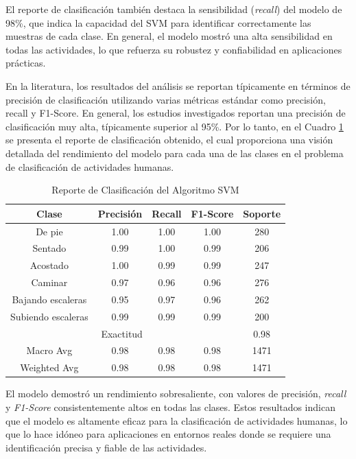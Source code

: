 \documentclass{esannV2}
\begin{document}
El reporte de clasificación también destaca la sensibilidad (\textit{recall}) del modelo de 98\%, que indica la capacidad del SVM para identificar correctamente las muestras de cada clase. En general, el modelo mostró una alta sensibilidad en todas las actividades, lo que refuerza su robustez y confiabilidad en aplicaciones prácticas.

En la literatura, los resultados del análisis se reportan típicamente en términos de precisión de clasificación utilizando varias métricas estándar como precisión, recall y F1-Score. En general, los estudios investigados reportan una precisión de clasificación muy alta, típicamente superior al 95\%. Por lo tanto, en el Cuadro \ref{tab:classification_report} se presenta el reporte de clasificación obtenido, el cual proporciona una visión detallada del rendimiento del modelo para cada una de las clases en el problema de clasificación de actividades humanas.

\begin{table}[h]
    \centering
    \begin{tabular}{|c|c|c|c|c|}
        \hline
        \textbf{Clase} & \textbf{Precisión} & \textbf{Recall} & \textbf{F1-Score} & \textbf{Soporte} \\ \hline
        De pie & 1.00 & 1.00 & 1.00 & 280 \\ \hline
        Sentado & 0.99 & 1.00 & 0.99 & 206 \\ \hline
        Acostado & 1.00 & 0.99 & 0.99 & 247 \\ \hline
        Caminar & 0.97 & 0.96 & 0.96 & 276 \\ \hline
        Bajando escaleras & 0.95 & 0.97 & 0.96 & 262 \\ \hline
        Subiendo escaleras & 0.99 & 0.99 & 0.99 & 200 \\ \hline
        \multicolumn{4}{|c|}{Exactitud} & 0.98 \\ \hline
        \multicolumn{1}{|c|}{Macro Avg} & 0.98 & 0.98 & 0.98 & 1471 \\ \hline
        \multicolumn{1}{|c|}{Weighted Avg} & 0.98 & 0.98 & 0.98 & 1471 \\ \hline
    \end{tabular}
    \caption{Reporte de Clasificación del Algoritmo SVM}
    \label{tab:classification_report}
\end{table}

El modelo demostró un rendimiento sobresaliente, con valores de precisión, \textit{recall} y \textit{F1-Score} consistentemente altos en todas las clases. Estos resultados indican que el modelo es altamente eficaz para la clasificación de actividades humanas, lo que lo hace idóneo para aplicaciones en entornos reales donde se requiere una identificación precisa y fiable de las actividades.
\end{document}
